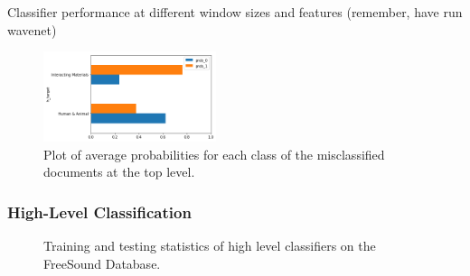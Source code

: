 Classifier performance at different window sizes and features (remember, have run wavenet)

\begin{figure}[h]
    \centering
    \includegraphics[width=0.45\textwidth]{figures/knn-prob-plot.png}
    \caption{Plot of average probabilities for each class of the misclassified documents at the top level.}
    \label{fig:a}
\end{figure}

\subsubsection{High-Level Classification}

\begin{figure}
    \centering
    \hfill
    \caption{Training and testing statistics of high level classifiers on the FreeSound Database.}
\end{figure}

